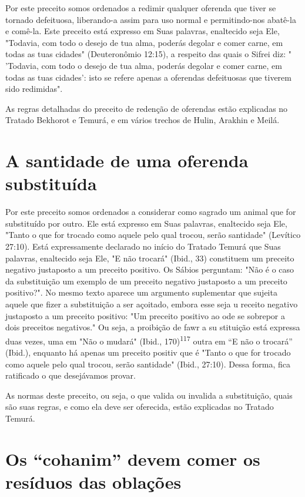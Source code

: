 Por este preceito somos ordenados a redimir qualquer oferenda que tiver
se tornado defeituosa, liberando-a assim para uso normal e
permitindo-nos abatê-la e comê-la. Este preceito está expresso em Suas
palavras, enaltecido seja Ele, "Todavia, com todo o desejo de tua alma,
poderás degolar e comer carne, em todas as tuas cidades" (Deuteronômio
12:15), a respeito das quais o Sifrei diz: " 'Todavia, com todo o desejo
de tua alma, poderás degolar e co­mer carne, em todas as tuas cidades':
isto se refere apenas a oferendas defeituo­sas que tiverem sido
redimidas".

As regras detalhadas do preceito de redenção de oferendas estão
ex­plicadas no Tratado Bekhorot e Temurá, e em vários trechos de Hulin,
Arakhin e Meilá.

\section{A santidade de uma oferenda substituída}

Por este preceito somos ordenados a considerar como sagrado um animal
que for substituído por outro. Ele está expresso em Suas palavras,
enalte­cido seja Ele, "Tanto o que for trocado como aquele pelo qual
trocou, serão san­tidade" (Levítico 27:10). Está expressamente declarado
no início do Tratado Te­murá que Suas palavras, enaltecido seja Ele, "E
não trocará" (Ibid., 33) consti­tuem um preceito negativo justaposto a
um preceito positivo. Os Sábios pergun­tam: "Não é o caso da
substituição um exemplo de um preceito negativo justa­posto a um
preceito positivo?". No mesmo texto aparece um argumento suple­mentar
que sujeita aquele que fizer a substituição a ser açoitado, embora esse
seja u receito negativo justaposto a um preceito positivo: "Um preceito
posi­tivo ao ode se sobrepor a dois preceitos negativos." Ou seja, a
proibição de fawr a su stituição está expressa duas vezes, uma em "Não o
mudará" (Ibid., 170)\textsuperscript{117} outra em ``E não o trocará''
(Ibid.), enquanto há apenas um preceito positiv que é "Tanto o que for
trocado como aquele pelo qual trocou, serão santidade" (Ibid., 27:10).
Dessa forma, fica ratificado o que desejávamos provar.

As normas deste preceito, ou seja, o que valida ou invalida a
substi­tuição, quais são suas regras, e como ela deve ser oferecida,
estão explicadas no Tratado Temurá.


\section{Os ``cohanim'' devem comer os resíduos das oblações}

